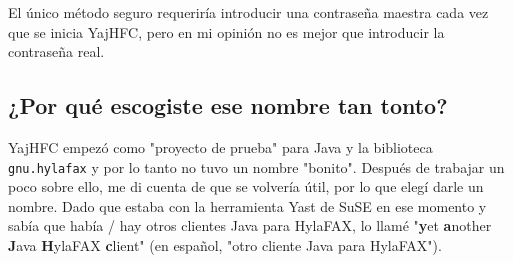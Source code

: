\documentclass[a4paper,10pt]{scrartcl}
\begin{document}
El único método seguro requeriría introducir una contraseña maestra cada vez que se inicia YajHFC, pero en mi opinión no es mejor que introducir la contraseña real.


\subsection{¿Por qué escogiste ese nombre tan tonto?}

YajHFC empezó como "proyecto de prueba" para Java y la biblioteca \texttt{gnu.hylafax}
y por lo tanto no tuvo un nombre "bonito". Después de trabajar un poco sobre ello, me di cuenta de que se volvería útil, por lo que elegí darle un nombre.
Dado que estaba con la herramienta Yast de SuSE en ese momento y sabía 
que había / hay otros clientes Java para HylaFAX, lo llamé "\textbf{y}et \textbf{a}nother \textbf{J}ava \textbf{H}ylaFAX \textbf{c}lient" (en español, "otro cliente Java para HylaFAX").
 
\end{document}
